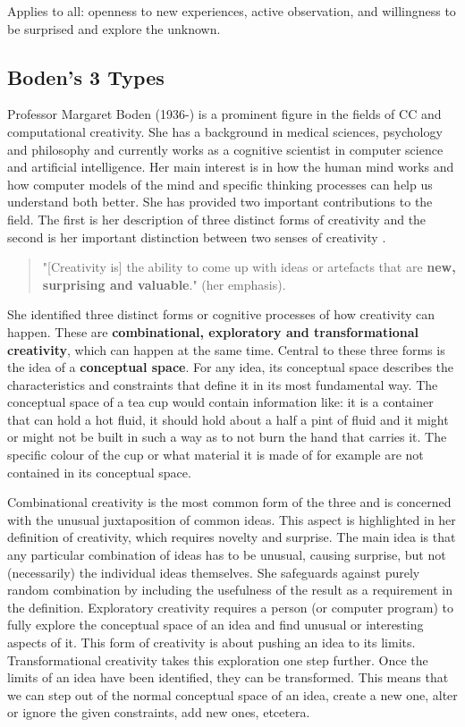 Applies to all: openness to new experiences, active observation, and willingness to be surprised and explore the unknown.

\subsection{Boden's 3 Types}

Professor Margaret Boden (1936-) is a prominent figure in the fields of CC and computational creativity. She has a background in medical sciences, psychology and philosophy and currently works as a cognitive scientist in computer science and artificial intelligence. Her main interest is in how the human mind works and how computer models of the mind and specific thinking processes can help us understand both better. She has provided two important contributions to the field. The first is her description of three distinct forms of creativity and the second is her important distinction between two senses of creativity \citep{Boden2003}.

\begin{quote}
  "[Creativity is] the ability to come up with ideas or artefacts that are \textbf{new, surprising and valuable}." \citep{Boden2003} (her emphasis).
\end{quote}

She identified three distinct forms or cognitive processes of how creativity can happen. These are \textbf{combinational, exploratory and transformational creativity}, which can happen at the same time. Central to these three forms is the idea of a \textbf{conceptual space}. For any idea, its conceptual space describes the characteristics and constraints that define it in its most fundamental way. The conceptual space of a tea cup would contain information like: it is a container that can hold a hot fluid, it should hold about a half a pint of fluid and it might or might not be built in such a way as to not burn the hand that carries it. The specific colour of the cup or what material it is made of for example are not contained in its conceptual space.

Combinational creativity is the most common form of the three and is concerned with the unusual juxtaposition of common ideas. This aspect is highlighted in her definition of creativity, which requires novelty and surprise. The main idea is that any particular combination of ideas has to be unusual, causing surprise, but not (necessarily) the individual ideas themselves. She safeguards against purely random combination by including the usefulness of the result as a requirement in the definition. Exploratory creativity requires a person (or computer program) to fully explore the conceptual space of an idea and find unusual or interesting aspects of it. This form of creativity is about pushing an idea to its limits. Transformational creativity takes this exploration one step further. Once the limits of an idea have been identified, they can be transformed. This means that we can step out of the normal conceptual space of an idea, create a new one, alter or ignore the given constraints, add new ones, etcetera.

